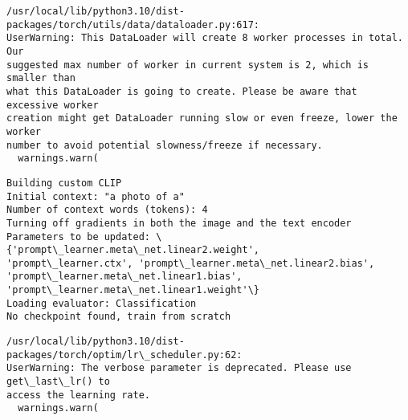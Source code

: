 \documentclass[11pt]{article}
\begin{document}
    \begin{Verbatim}[commandchars=\\\{\}]
/usr/local/lib/python3.10/dist-packages/torch/utils/data/dataloader.py:617:
UserWarning: This DataLoader will create 8 worker processes in total. Our
suggested max number of worker in current system is 2, which is smaller than
what this DataLoader is going to create. Please be aware that excessive worker
creation might get DataLoader running slow or even freeze, lower the worker
number to avoid potential slowness/freeze if necessary.
  warnings.warn(
    \end{Verbatim}

    \begin{Verbatim}[commandchars=\\\{\}]
Building custom CLIP
Initial context: "a photo of a"
Number of context words (tokens): 4
Turning off gradients in both the image and the text encoder
Parameters to be updated: \{'prompt\_learner.meta\_net.linear2.weight',
'prompt\_learner.ctx', 'prompt\_learner.meta\_net.linear2.bias',
'prompt\_learner.meta\_net.linear1.bias',
'prompt\_learner.meta\_net.linear1.weight'\}
Loading evaluator: Classification
No checkpoint found, train from scratch
    \end{Verbatim}

    \begin{Verbatim}[commandchars=\\\{\}]
/usr/local/lib/python3.10/dist-packages/torch/optim/lr\_scheduler.py:62:
UserWarning: The verbose parameter is deprecated. Please use get\_last\_lr() to
access the learning rate.
  warnings.warn(
    \end{Verbatim}
\end{document}
